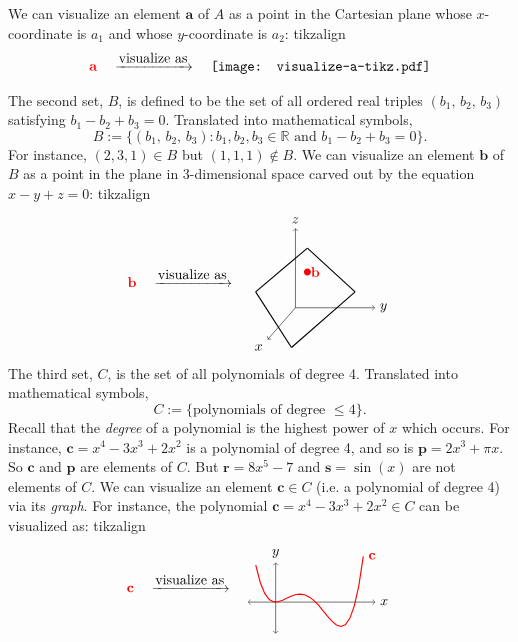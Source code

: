 \documentclass[a4paper,11pt]{book}
\theoremstyle{definition}
\newcommand{\be}{\begin{equation}}
\newcommand{\ee}{\end{equation}}
\newcommand{\ve}[1]{\mathbf{#1}}
\begin{document}
We can visualize an element $\ve{a}$ of $A$ as a point in the Cartesian plane whose $x$-coordinate is $a_1$ and whose $y$-coordinate is $a_2$:
tikzalign
\begin{align*}
{\color{red} \ve{a}} \quad \xrightarrow{\mbox{visualize as}} \quad
\texttt{[image: visualize-a-tikz.pdf]}
\end{align*}



The second set, $B$, is defined to be the set of all ordered real triples $(b_1, \, b_2, \, b_3)$ satisfying $b_1 - b_2 + b_3 = 0$. Translated into mathematical symbols,
\be
 B := \{ (b_1, \, b_2, \, b_3) : b_1, b_2, b_3 \in \mathbb{R} \mbox{ and } b_1 - b_2 + b_3 = 0\} .
\ee
For instance, $(2,3, 1) \in B$ but $(1,1,1) \notin B$. We can visualize an element $\ve{b}$ of $B$ as a point in the plane in 3-dimensional space carved out by the equation $x-y+z = 0$:
tikzalign
\begin{align*}
{\color{red} \ve{b}} \quad \xrightarrow{\mbox{visualize as}} \quad
\begin{tikzpicture}[baseline={([yshift=-.5ex]current bounding box.center)},vertex/.style={anchor=base,
	circle,fill=black!25,minimum size=18pt,inner sep=2pt}]
\draw[->] (0, 0) -- (2,0) node[right] {$y$};
\draw[->] (0, 0) -- (0, 2) node[above] {$z$};
\draw[->] (0,0) -- (-0.7, -0.8) node[below left] {$x$};
\node [circle, fill=red, inner sep=0pt, minimum size=5pt] (P) at (0.3, 0.9) {};
\node[color=red] at (0.5, 0.9) {$\ve{b}$};
\draw[thick] (-0.1, -1) -- (-1, 0.4);
\draw[thick] (-1, 0.4) -- (0.3, 1.5);
\draw[thick] (0.3, 1.5) -- (1.5, 0.4);
\draw[thick] (1.5, 0.4) -- (-0.1, -1);
\end{tikzpicture}
\end{align*}
The third set, $C$, is the set of all polynomials of degree 4. Translated into mathematical symbols,
\be
 C := \{ \mbox{polynomials of degree $\leq 4$}\}.
\ee
Recall that the {\em degree} of a polynomial is the highest power of $x$ which occurs.  For instance, $\ve{c} = x^4 - 3 x^3 + 2x^2$ is a polynomial of degree 4, and so is $\ve{p} = 2x^3 + \pi x$. So $\ve{c}$ and $\ve{p}$ are elements of $C$. But $\ve{r} = 8x^5 - 7$ and $\ve{s} = \sin(x)$ are not elements of $C$. We can visualize an element $\ve{c} \in C$ (i.e. a polynomial of degree 4) via its {\em graph}. For instance, the polynomial $\ve{c} = x^4 - 3x^3 + 2x^2 \in C$ can be visualized as:
tikzalign
\begin{align*}
{\color{red} \ve{c}} \quad \xrightarrow{\mbox{visualize as}} \quad
\begin{tikzpicture}[baseline={([yshift=-.5ex]current bounding box.center)},vertex/.style={anchor=base,
	circle,fill=black!25,minimum size=18pt,inner sep=2pt},domain=-0.5:2.2]
\draw[<->] (-0.7, 0) -- (2.5,0) node[right] {$x$};
\draw[<->] (0, -0.8) -- (0, 1) node[above] {$y$};    
\draw[color=red, thick] plot[id=p]  (\x, {(\x-2)*\x*\x*(\x-1)}) 
node[right] {$\ve{c}$};
\end{tikzpicture}
\end{align*}
\end{document}
